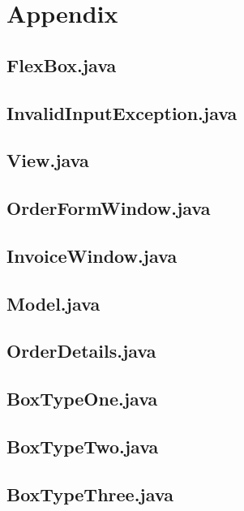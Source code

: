 \documentclass[12pt]{article}
\begin{document}
\section{Appendix}
\subsection{FlexBox.java}

\newpage
\subsection{InvalidInputException.java}

\newpage
\subsection{View.java}

\newpage
\subsection{OrderFormWindow.java \cite{NETBEANS}}

\newpage
\subsection{InvoiceWindow.java \cite{NETBEANS}}

\newpage
\subsection{Model.java}

\newpage
\subsection{OrderDetails.java}

\newpage
\subsection{BoxTypeOne.java}

\newpage
\subsection{BoxTypeTwo.java}

\newpage
\subsection{BoxTypeThree.java}

\newpage
\end{document}
